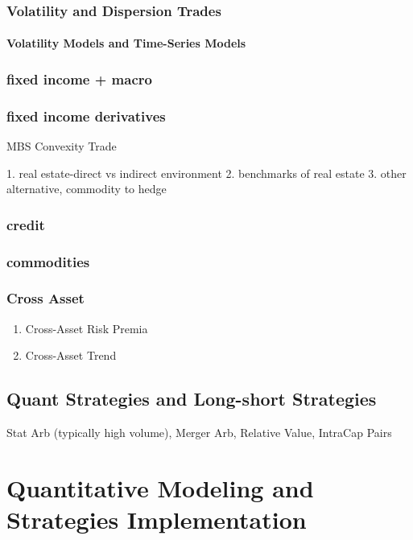 \documentclass[11pt, openany]{book}              %
\begin{document}
\section{Volatility and Dispersion Trades}
	\subsection{Volatility Models and Time-Series Models}
	
\section{fixed income + macro}
\section{fixed income derivatives}

MBS Convexity Trade

    1. real estate-direct vs indirect environment  
    2. benchmarks of real estate
    3. other alternative, commodity to hedge

\section{credit}
\section{commodities} 
\section{Cross Asset}

\begin{enumerate}
 \item Cross-Asset Risk Premia
 \item Cross-Asset Trend
\end{enumerate}


\chapter{Quant Strategies and Long-short Strategies}

Stat Arb (typically high volume), Merger Arb, Relative Value, IntraCap Pairs 
 

\part{Quantitative Modeling and Strategies Implementation}
\end{document}
